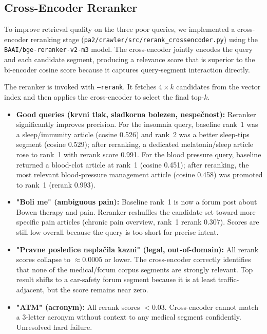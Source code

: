 \documentclass[9pt]{IEEEtran}
\begin{document}
\subsection{Cross-Encoder Reranker}
To improve retrieval quality on the three poor queries, we implemented a cross-encoder reranking stage (\texttt{pa2/crawler/src/rerank\_crossencoder.py})
using the \texttt{BAAI/bge-reranker-v2-m3} model. The cross-encoder jointly encodes the query and each candidate segment, producing a relevance score that is superior to the bi-encoder cosine score because it captures query-segment interaction directly.

The reranker is invoked with \texttt{--rerank}. It fetches $4\times k$ candidates from the vector index and then applies the cross-encoder to select the final top-$k$.

\begin{itemize}
    \item \textbf{Good queries (krvni tlak, sladkorna bolezen, nespečnost):} Reranker significantly improves precision.
    For the insomnia query, baseline rank~1 was a sleep/immunity article (cosine 0.526) and rank~2 was a better sleep-tips segment (cosine 0.529);
    after reranking, a dedicated melatonin/sleep article rose to rank~1 with rerank score 0.991. For the blood pressure query, baseline returned a blood-clot article at rank~1 (cosine 0.451);
    after reranking, the most relevant blood-pressure management article (cosine 0.458) was promoted to rank~1 (rerank 0.993).
    \item \textbf{"Boli me" (ambiguous pain):} Baseline rank~1 is now a forum post about Bowen therapy and pain. Reranker reshuffles the candidate set toward more specific pain articles
    (chronic pain overview, rank~1 rerank 0.307). Scores are still low overall because the query is too short for precise intent.
    \item \textbf{"Pravne posledice neplačila kazni" (legal, out-of-domain):} All rerank scores collapse to $\approx 0.0005$ or lower.
    The cross-encoder correctly identifies that none of the medical/forum corpus segments are strongly relevant. Top result shifts to a car-safety forum segment because it is at least traffic-adjacent, but the score remains near zero.
    \item \textbf{"ATM" (acronym):} All rerank scores $< 0.03$. Cross-encoder cannot match a 3-letter acronym without context to any medical segment confidently. Unresolved hard failure.
\end{itemize}
\end{document}
